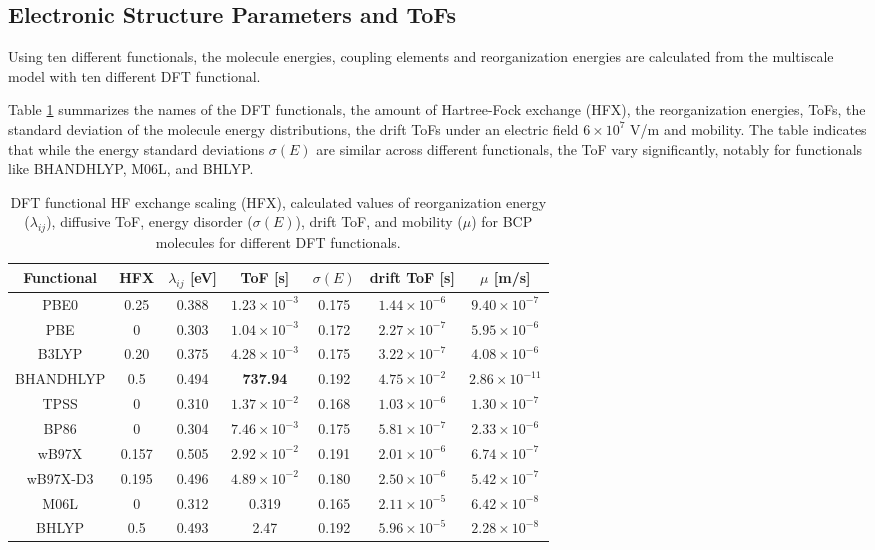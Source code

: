 \documentclass[letterpaper,12pt]{article}
\begin{document}
\subsection{Electronic Structure Parameters and ToFs}
Using ten different functionals, the molecule energies, coupling elements and reorganization energies are calculated from the multiscale model with ten different DFT functional.

Table \ref{tab:para} summarizes the names of the DFT functionals, the amount of Hartree-Fock exchange (HFX), the reorganization energies, ToFs, the standard deviation of the molecule energy distributions, the drift ToFs under an electric field $6 \times 10^7$ V/m and mobility.
The table indicates that while the energy standard deviations $\sigma(E)$ are similar across different functionals, the ToF vary significantly, notably for functionals like BHANDHLYP, M06L, and BHLYP.

\begin{table}[H]
    \centering
    \begin{tabular}{c c c c c c c}
    \hline
        Functional & HFX & $\lambda_{ij}$ [eV] & ToF [s] & $\sigma(E)$ & drift ToF [s] & $\mu$ [m/s] \\ 
        \hline
        PBE0 & 0.25 & 0.388 & $1.23\times 10^{-3}$ & 0.175 & $1.44 \times 10^{-6}$ & $9.40\times 10^{-7}$ \\
        PBE & 0 & 0.303 & $1.04\times 10^{-3}$ & 0.172 & $2.27 \times 10^{-7}$ & $5.95 \times 10^{-6}$ \\ 
        B3LYP & 0.20 & 0.375 & $4.28\times 10^{-3}$ & 0.175  & $3.22\times 10^{-7}$ & $4.08 \times 10^{-6}$ \\
        BHANDHLYP & 0.5 & 0.494 & \textbf{737.94} & 0.192  & $4.75\times 10^{-2}$ & $2.86\times 10^{-11}$ \\
        TPSS & 0 & 0.310 & $1.37\times 10^{-2}$ & 0.168  & $1.03 \times 10^{-6}$ & $1.30\times 10^{-7}$ \\
        BP86 & 0 & 0.304 & $7.46\times 10^{-3}$ & 0.175  & $5.81 \times 10^{-7}$ & $2.33\times 10^{-6}$ \\
        wB97X & 0.157 & 0.505 & $2.92\times 10^{-2}$ & 0.191  & $2.01\times 10^{-6}$  & $6.74\times 10^{-7}$ \\
        wB97X-D3 & 0.195 & 0.496 & $4.89\times 10^{-2}$ & 0.180  & $2.50 \times 10^{-6}$ & $5.42 \times 10^{-7}$ \\
        M06L & 0 & 0.312 & 0.319 & 0.165 & $2.11 \times 10^{-5}$ & $6.42 \times 10^{-8}$ \\
        BHLYP & 0.5 & 0.493 & 2.47 & 0.192  & $5.96 \times 10^{-5}$ & $ 2.28\times 10^{-8}$  \\
    \hline
    \end{tabular}
    \caption{DFT functional HF exchange scaling (HFX), calculated values of reorganization energy ($\lambda_{ij}$), diffusive ToF, energy disorder ($\sigma(E)$), drift ToF, and mobility ($\mu$) for BCP molecules for different DFT functionals.}
    \label{tab:para}
\end{table}
\end{document}
